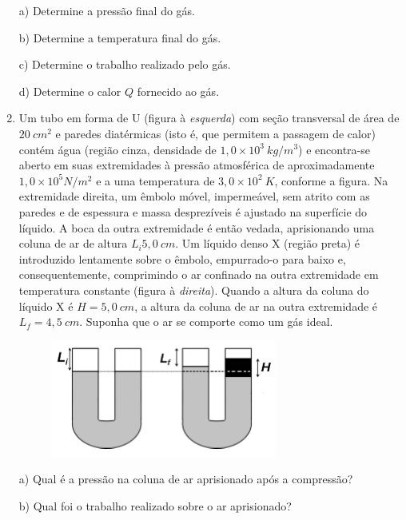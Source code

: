 \begin{enumerate}[start=1,label={\bfseries Q\arabic*.}]
  a) Determine a pressão final do gás.

  \resposta

  b) Determine a temperatura final do gás.

  \resposta

  c) Determine o trabalho realizado pelo gás.

  \resposta

  d) Determine o calor $Q$ fornecido ao gás.

  \resposta





\item Um tubo em forma de U (figura à \textit{esquerda}) com seção transversal de área de $20 \ cm^{2}$ e paredes diatérmicas (isto é, que permitem a passagem de calor) contém água (região cinza, densidade de $1,0 \times 10^{3} \ kg/m^{3}$) e encontra-se aberto em suas extremidades à pressão atmosférica de aproximadamente $1,0 \times 10^{5} N/m^{2}$ e a uma temperatura de $3,0 \times 10^{2} \ K$, conforme a figura. Na extremidade direita, um êmbolo móvel, impermeável, sem atrito com as paredes e de espessura e massa desprezíveis é ajustado na superfície do líquido. A boca da outra extremidade é então vedada, aprisionando uma coluna de ar de altura $L_{i} 5,0 \ cm$. Um líquido denso X (região preta) é introduzido lentamente sobre o êmbolo, empurrado-o para baixo e, consequentemente, comprimindo o ar confinado na outra extremidade em temperatura constante (figura à \textit{direita}). Quando a altura da coluna do líquido X é $H = 5,0 \ cm$, a altura da coluna de ar na outra extremidade é $L_{f} = 4,5 \ cm$. Suponha que o ar se comporte como um gás ideal.

\begin{figure}[H]
  \centering
  \includegraphics[scale=1]{termica-img/tubo2.png}
\end{figure}


a) Qual é a pressão na coluna de ar aprisionado após a compressão?

\resposta

b) Qual foi o trabalho realizado sobre o ar aprisionado?


\end{enumerate}
